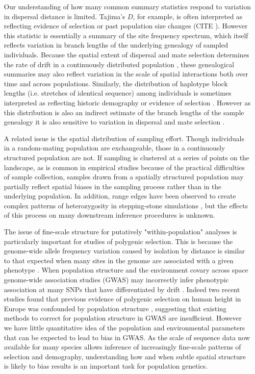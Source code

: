 \documentclass[11pt,twoside,lineno]{preprint}
\newif\ifcomments
\newcommand{\cjb}[1]{\ifcomments{{\color{orange} \it (#1)}}\else{}\fi}
\begin{document}
Our understanding of how many common summary statistics respond to variation in dispersal distance is limited. Tajima's $D$, for example, is often interpreted as reflecting evidence of selection or past population size changes (CITE \cjb{CJ: what's a good citation here?}). However this statistic is essentially a summary of the site frequency spectrum, which itself reflects variation in branch lengths of the underlying genealogy of sampled individuals. Because the spatial extent of dispersal and mate selection determines the rate of drift in a continuously distributed population \citep{Maruyama1972}, these genealogical summaries may also reflect variation in the scale of spatial interactions both over time and across populations. Similarly, the distribution of haplotype block lengths (i.e. stretches of identical sequence) among individuals is sometimes interpreted as reflecting historic demography \citep{Harris2013} or evidence of selection \citep{Garud2015}. However as this distribution is also an indirect estimate of the branch lengths of the sample genealogy it is also sensitive to variation in dispersal and mate selection \citep{Ringbauer2017,Baharian2016}. 

A related issue is the spatial distribution of sampling effort. Though individuals in a random-mating population are exchangeable, those in a continuously structured population are not. If sampling is clustered at a series of points on the landscape, as is common in empirical studies because of the practical difficulties of sample collection, samples drawn from a spatially structured population may partially reflect spatial biases in the sampling process rather than in the underlying population. In addition, range edges have been observed to create complex patterns of heterozygosity in stepping-stone simulations \citep{Neel2013,Shirk2014}, but the effects of this process on many downstream inference procedures is unknown. \cjb{must be more out there on sampling -- any recs for papers to read+cite?}

The issue of fine-scale structure for putatively "within-population" analyses is particularly important for studies of polygenic selection. This is because the genome-wide allele frequency variation caused by isolation by distance is similar to that expected when many sites in the genome are associated with a given phenotype \citep{Bulik-Sullivan2015}. When population structure and the environment covary across space genome-wide association studies (GWAS) may incorrectly infer phenotypic association at many SNPs that have differentiated by drift \citep{Mathieson2012}. Indeed two recent studies found that previous evidence of polygenic selection on human height in Europe was confounded by population structure \citep{Sohail2018,Berg2018}, suggesting that existing methods to correct for population structure in GWAS are insufficient. However we have little quantitative idea of the population and environmental parameters that can be expected to lead to bias in GWAS. As the scale of sequence data now available for many species allows inference of increasingly fine-scale patterns of selection and demography, understanding how and when subtle spatial structure is likely to bias results is an important task for population genetics.
\end{document}
